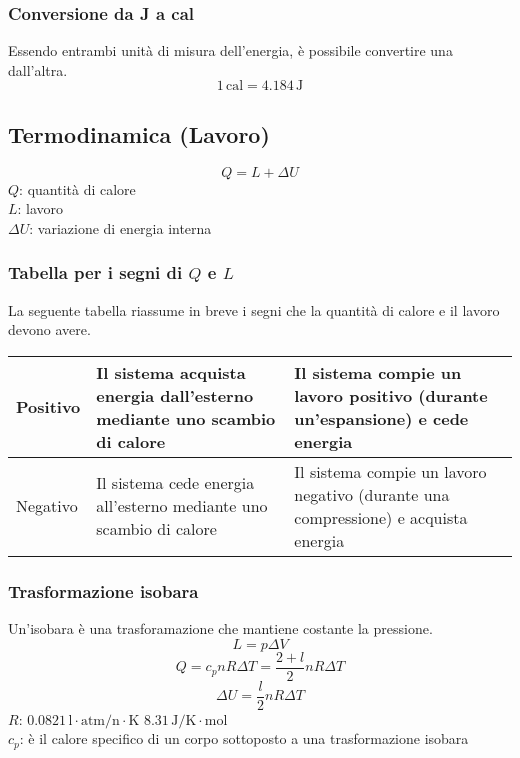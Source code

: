 \subsubsection{Conversione da J a cal}
Essendo entrambi unità di misura dell'energia, è possibile convertire una dall'altra.
\begin{equation*}
  1\,\text{cal} = 4.184\,\text{J}
\end{equation*}


\subsection{Termodinamica (Lavoro)}
\begin{equation*}
  Q = L+\Delta U
\end{equation*}
$Q$: quantità di calore\\
$L$: lavoro\\
$\Delta U$: variazione di energia interna

\subsubsection{Tabella per i segni di $Q$ e $L$}
La seguente tabella riassume in breve i segni che la quantità di calore e il lavoro devono avere.
\tablelasttail{\bottomrule}
\begin{center}
  \begin{xtabular}{M{2cm} M{2cm} M{2cm}}
    Positivo & Il sistema acquista energia dall'esterno mediante uno scambio di calore &
    Il sistema compie un lavoro positivo (durante un'espansione) e cede energia\\ \midrule
    Negativo & Il sistema cede energia all'esterno mediante uno scambio di calore &
    Il sistema compie un lavoro negativo (durante una compressione) e acquista energia\\
  \end{xtabular}
\end{center}
\subsubsection{Trasformazione isobara}
Un'isobara è una trasforamazione che mantiene costante la pressione.
\begin{equation*}
  L = p\Delta V
\end{equation*}
\begin{equation*}
  Q = c_pnR\Delta T=\frac{2+l}{2}nR\Delta T
\end{equation*}
\begin{equation*}
  \Delta U = \frac{l}{2}nR\Delta T
\end{equation*}
\hyperref[tab:R]{$R$}: $0.0821\,\text{l}\cdot\text{atm/n}\cdot\text{K}$
$8.31\,\text{J/K}\cdot\text{mol}$\\
$c_p$: è il calore specifico di un corpo sottoposto a una trasformazione isobara

